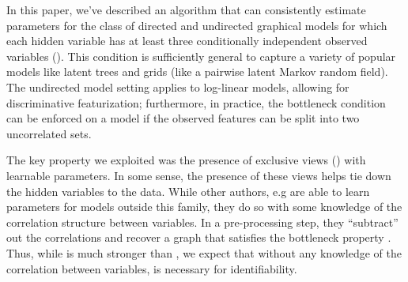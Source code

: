In this paper, we've described an algorithm that can consistently
  estimate parameters for the class of directed and undirected graphical
  models for which each hidden variable has at least three conditionally
  independent observed variables ().
This condition is sufficiently general to capture a variety of popular
  models like latent trees and grids (like a pairwise latent Markov
  random field).
The undirected model setting applies to log-linear models, allowing
  for discriminative featurization; furthermore, in practice, the
  bottleneck condition can be enforced on a model if the observed
  features can be split into two uncorrelated sets.

The key property we exploited was the presence of exclusive views
  () with learnable parameters.
In some sense, the presence of these views helps tie down the hidden
  variables to the data. 
While other authors, e.g \citet{anandkumar12lda, anandkumar2013linear,
  halpern13noisyor} are able to learn parameters for models outside this
  family, they do so with some knowledge of the correlation structure
  between variables. 
In a pre-processing step, they ``subtract'' out the correlations and
  recover a graph that satisfies the bottleneck property
  .
Thus, while  is much stronger than
  , we expect that without any knowledge of
  the correlation between variables,  is
  necessary for identifiability.


